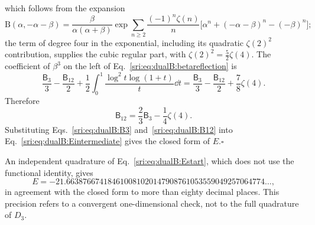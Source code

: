 which follows from the expansion
\begin{equation}
 \mathrm B(\alpha,-\alpha-\beta)=\frac{\beta}{\alpha(\alpha+\beta)}\exp\sum_{n\ge2}\frac{(-1)^n\zeta(n)}{n}
 \bigl[\alpha^n+(-\alpha-\beta)^n-(-\beta)^n\bigr];
\end{equation}
the term of degree four in the exponential, including its quadratic $\zeta(2)^2$ contribution, supplies the cubic
regular part, with $\zeta(2)^2=\frac52\zeta(4)$. The coefficient of $\beta^3$ on the left of
Eq.~\eqref{sri:eq:dualB:betareflection} is
\begin{equation}
 \frac{\mathsf B_3}{3}-\frac{\mathsf B_{12}}{2}+\frac12\int_0^1\frac{\log^2t\log(1+t)}{t}\dd t
 =\frac{\mathsf B_3}{3}-\frac{\mathsf B_{12}}{2}+\frac78\zeta(4).
\end{equation}
Therefore
\begin{equation}
 \mathsf B_{12}=\frac23\mathsf B_3-\frac14\zeta(4).
 \label{sri:eq:dualB:B12}
\end{equation}
Substituting Eqs.~\eqref{sri:eq:dualB:B3} and~\eqref{sri:eq:dualB:B12} into Eq.~\eqref{sri:eq:dualB:Eintermediate} gives the
closed form of $E$.\hfill$\square$

An independent quadrature of Eq.~\eqref{sri:eq:dualB:Estart}, which does not use the functional identity, gives
\begin{equation}
 E=-21.663876674184610081020147908761053559049257064774\ldots,
\end{equation}
in agreement with the closed form to more than eighty decimal places. This precision refers to a convergent
one-dimensional check, not to the full quadrature of $D_3$.

